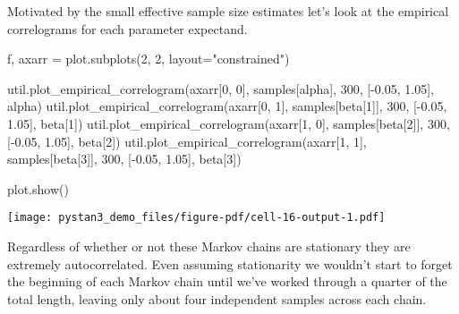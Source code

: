 \documentclass[
  letterpaper,
  DIV=11,
  numbers=noendperiod]{scrartcl}
\newenvironment{Shaded}{\begin{snugshade}}{\end{snugshade}}
\newcommand{\DecValTok}[1]{\textcolor[rgb]{0.68,0.00,0.00}{#1}}
\newcommand{\FloatTok}[1]{\textcolor[rgb]{0.68,0.00,0.00}{#1}}
\newcommand{\NormalTok}[1]{\textcolor[rgb]{0.00,0.23,0.31}{#1}}
\newcommand{\OperatorTok}[1]{\textcolor[rgb]{0.37,0.37,0.37}{#1}}
\newcommand{\StringTok}[1]{\textcolor[rgb]{0.13,0.47,0.30}{#1}}
\begin{document}
Motivated by the small effective sample size estimates let's look at the
empirical correlograms for each parameter expectand.

\begin{Shaded}
\begin{Highlighting}[]
\NormalTok{f, axarr }\OperatorTok{=}\NormalTok{ plot.subplots(}\DecValTok{2}\NormalTok{, }\DecValTok{2}\NormalTok{, layout}\OperatorTok{=}\StringTok{"constrained"}\NormalTok{)}

\NormalTok{util.plot\_empirical\_correlogram(axarr[}\DecValTok{0}\NormalTok{, }\DecValTok{0}\NormalTok{], samples[}\StringTok{\textquotesingle{}alpha\textquotesingle{}}\NormalTok{], }
                                \DecValTok{300}\NormalTok{, [}\OperatorTok{{-}}\FloatTok{0.05}\NormalTok{, }\FloatTok{1.05}\NormalTok{],  }\StringTok{\textquotesingle{}alpha\textquotesingle{}}\NormalTok{)}
\NormalTok{util.plot\_empirical\_correlogram(axarr[}\DecValTok{0}\NormalTok{, }\DecValTok{1}\NormalTok{], samples[}\StringTok{\textquotesingle{}beta[1]\textquotesingle{}}\NormalTok{], }
                                \DecValTok{300}\NormalTok{, [}\OperatorTok{{-}}\FloatTok{0.05}\NormalTok{, }\FloatTok{1.05}\NormalTok{],  }\StringTok{\textquotesingle{}beta[1]\textquotesingle{}}\NormalTok{)}
\NormalTok{util.plot\_empirical\_correlogram(axarr[}\DecValTok{1}\NormalTok{, }\DecValTok{0}\NormalTok{], samples[}\StringTok{\textquotesingle{}beta[2]\textquotesingle{}}\NormalTok{], }
                                \DecValTok{300}\NormalTok{, [}\OperatorTok{{-}}\FloatTok{0.05}\NormalTok{, }\FloatTok{1.05}\NormalTok{],  }\StringTok{\textquotesingle{}beta[2]\textquotesingle{}}\NormalTok{)}
\NormalTok{util.plot\_empirical\_correlogram(axarr[}\DecValTok{1}\NormalTok{, }\DecValTok{1}\NormalTok{], samples[}\StringTok{\textquotesingle{}beta[3]\textquotesingle{}}\NormalTok{], }
                                \DecValTok{300}\NormalTok{, [}\OperatorTok{{-}}\FloatTok{0.05}\NormalTok{, }\FloatTok{1.05}\NormalTok{],  }\StringTok{\textquotesingle{}beta[3]\textquotesingle{}}\NormalTok{)}

\NormalTok{plot.show()}
\end{Highlighting}
\end{Shaded}

\texttt{[image: pystan3\_demo\_files/figure-pdf/cell-16-output-1.pdf]}

Regardless of whether or not these Markov chains are stationary they are
extremely autocorrelated. Even assuming stationarity we wouldn't start
to forget the beginning of each Markov chain until we've worked through
a quarter of the total length, leaving only about four independent
samples across each chain.
\end{document}
